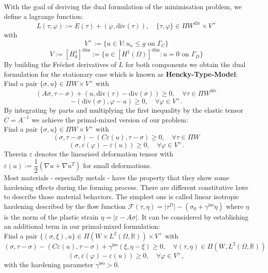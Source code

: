 \documentclass{article}
\begin{document}
With the goal of deriving the dual formulation of the minimisation
problem, we define a lagrange function:
$$L(\tau,\varphi) := E(\tau) + (\varphi, \textrm{div}(\tau)),\quad \lbrace\tau,\varphi\rbrace\in\Pi W^{\textrm{div}}\times V^+$$
with
$$V^+ := \lbrace u\in V: u_n\leq g \text{ on } \Gamma_C \rbrace$$
$$V:=\left[ H_0^1 \right]^{\textrm{dim}}:=\lbrace u\in \left[H^1(\Omega)\right]^{\textrm{dim}}: u
= 0 \text{ on } \Gamma_D\rbrace$$
By building the Fr\'echet derivatives of $L$ for both components we obtain the
dual formulation for the stationary case which is known as \textbf{Hencky-Type-Model}:\\
Find a pair $\lbrace\sigma,u\rbrace\in \Pi W\times V^+$ with
$$\left(A\sigma,\tau - \sigma\right) + \left(u, \textrm{div}(\tau) - \textrm{div}(\sigma)\right) \geq 0,\quad \forall \tau\in \Pi W^{\textrm{div}}$$
$$-\left(\textrm{div}(\sigma),\varphi - u\right) \geq 0,\quad \forall \varphi\in V^+.$$
By integrating by parts and multiplying the first inequality by the elastic
tensor $C=A^{-1}$ we achieve the primal-mixed version of our problem:\\
Find a pair $\lbrace\sigma,u\rbrace\in \Pi W\times V^+$ with
$$\left(\sigma,\tau - \sigma\right) - \left(C\varepsilon(u), \tau - \sigma\right) \geq 0,\quad \forall \tau\in \Pi W$$
$$\left(\sigma,\varepsilon(\varphi) - \varepsilon(u)\right) \geq 0,\quad \forall \varphi\in V^+.$$
Therein $\varepsilon$ denotes the linearised deformation tensor with $\varepsilon(u) := \dfrac{1}{2}\left(\nabla u + \nabla u^T\right)$ for small deformations.\\
Most materials - especially metals - have the property that they show some hardening effects during the forming process.
There are different constitutive laws to describe those material behaviors. The
simplest one is called linear isotropic hardening described by the flow function
$\mathcal{F}(\tau,\eta) = \vert\tau^D\vert - (\sigma_0 + \gamma^{\text{iso}}\eta)$ where
$\eta$ is the norm of the plastic strain $\eta = \vert \varepsilon -
A\sigma\vert$.
It can be considered by establishing an additional term in our primal-mixed formulation:\\
Find a pair $\lbrace(\sigma,\xi),u\rbrace\in \Pi (W\times L^2(\Omega,\mathbb{R}))\times V^+$ with
$$\left(\sigma,\tau - \sigma\right) - \left(C\varepsilon(u), \tau - \sigma\right) + \gamma^{\text{iso}}\left( \xi, \eta - \xi\right) \geq 0,\quad \forall (\tau,\eta)\in \Pi (W,L^2(\Omega,\mathbb{R}))$$
$$\left(\sigma,\varepsilon(\varphi) - \varepsilon(u)\right) \geq 0,\quad \forall \varphi\in V^+,$$
with the hardening parameter $\gamma^{\text{iso}} > 0$.\\
\end{document}
